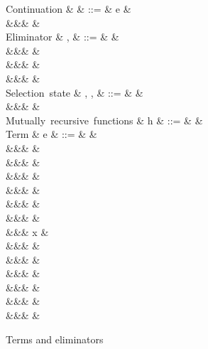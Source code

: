 \begin{figure}[H]
\begin{syntaxfig}
\mbox{Continuation}
&
\kappa
&
::=
&
e
&
\\
&&&
\sigma
&
\\[2mm]
\mbox{Eliminator}
&
\sigma, \tau
&
::=
&
&
\\
&&&
&
\\
&&&
\elimProd{\sigma}
&
\\
&&&
\elimList{\kappa}{\sigma}
&
\\[2mm]
\mbox{Selection state}
&
\alpha, \beta, \gamma
&
::=
&
\TT
&
\\
&&&
\FF
&
\\[2mm]
\mbox{Mutually recursive functions}
&
h
&
::=
&
&
\\[2mm]
\mbox{Term}
&
e
&
::=
&
\hole
&
\\
&&&
\annTrue{\alpha} \mid \annFalse{\alpha}
&
\\
&&&
&
\\
&&&
&
\\
&&&
\annNil{\alpha}
&
\\
&&&
&
\\
&&&
&
\\
&&&
x
&
\\
&&&
\exOp{\primOp}
&
\\
&&&
\exLambda{\sigma}
&
\\
&&&
&
\\
&&&
&
\\
&&&
&
\\
&&&
&
\end{syntaxfig}
\caption{Terms and eliminators}
\end{figure}
